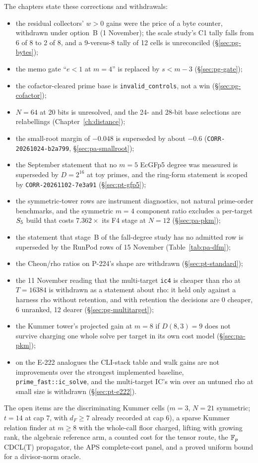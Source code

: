 The chapters state these corrections and withdrawals:
\begin{itemize}
\item the residual collectors' $w>0$ gains were the price of a byte
  counter, withdrawn under option~B (1 November); the scale study's C1 tally
  falls from 6 of 8 to 2 of 8, and a 9-versus-8 tally of 12 cells is
  unreconciled (\S\ref{sec:pg-bytes});
\item the memo gate ``$e<1$ at $m=4$'' is replaced by $s<m-3$
  (\S\ref{sec:pg-gate});
\item the cofactor-cleared prime base is \texttt{invalid\_controls}, not a
  win (\S\ref{sec:pg-cofactor});
\item $N=64$ at 20 bits is unresolved, and the 24- and 28-bit base
  selections are relabellings (Chapter~\ref{ch:distance});
\item the small-root margin of $-0.048$ is superseded by about $-0.6$
  (\texttt{CORR-20261024-b2a799}, \S\ref{sec:pa-smallroot});
\item the September statement that no $m=5$ EcGFp5 degree was measured is
  superseded by $D=2^{16}$ at toy primes, and the ring-form statement is
  scoped by \texttt{CORR-20261102-7e3a91} (\S\ref{sec:pt-gfp5});
\item the symmetric-tower rows are instrument diagnostics, not natural
  prime-order benchmarks, and the symmetric $m=4$ component ratio excludes a
  per-target $S_{5}$ build that costs $7.362\times$ its F4 stage at $N=12$
  (\S\ref{sec:pa-pkm});
\item the statement that stage~B of the fall-degree study has no admitted
  row is superseded by the RunPod rows of 15 November
  (Table~\ref{tab:pa-dfm});
\item the Cheon/rho ratios on P-224's shape are withdrawn
  (\S\ref{sec:pt-standard});
\item the 11 November reading that the multi-target \texttt{ic4} is
  cheaper than rho at $T=16384$ is withdrawn as a statement about rho: it
  held only against a harness rho without retention, and with retention the
  decisions are 0 cheaper, 6 unranked, 12 dearer (\S\ref{sec:pg-multitarget});
\item the Kummer tower's projected gain at $m=8$ if $D(8,3)=9$ does not
  survive charging one whole solve per target in its own cost model
  (\S\ref{sec:pa-pkm});
\item on the E-222 analogues the CLI-stack table and walk gains are not
  improvements over the strongest implemented baseline,
  \texttt{prime\_fast::ic\_solve}, and the multi-target IC's win over an
  untuned rho at small size is withdrawn (\S\ref{sec:pt-e222}).
\end{itemize}
The open items are the discriminating Kummer cells ($m=3$, $N=21$
symmetric; $t=14$ at cap 7, with $d_F\ge7$ already recorded at cap 6), a sparse Kummer relation finder at $m\ge8$ with
the whole-call floor charged, lifting with growing rank, the algebraic
reference arm, a counted cost
for the tensor route, the $\mathbb{F}_p$ CDCL(T) propagator, the APS complete-cost
panel, and a proved uniform bound for a divisor-norm oracle.
